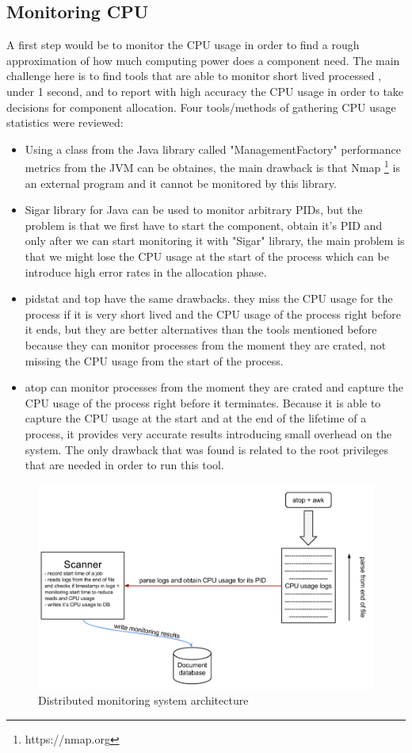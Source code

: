 \subsection{Monitoring CPU}
A first step would be to monitor the CPU usage in order to find a rough approximation of how much computing power does a component need. The main challenge here is to find tools that are able to monitor short lived processed , under 1 second, and to report with high accuracy the CPU usage in order to take decisions for component allocation. Four tools/methods of gathering CPU usage statistics were reviewed:  
\begin{itemize}
	\item Using a class from the Java library called "ManagementFactory" performance metrics from the JVM can be obtaines, the main drawback is that Nmap \footnote{https://nmap.org} is an external program and it cannot be monitored by this library.
	\item Sigar library for Java can be used to monitor arbitrary PIDs, but the problem is that we first have to start the component, obtain it's PID and only after we can start monitoring it with "Sigar" library, the main problem is that we might lose the CPU usage at the start of the process which can be introduce high error rates in the allocation phase.
	\item pidstat and top have the same drawbacks. they miss the CPU usage for the process if it is very short lived and the CPU usage of the process right before it ends, but they are better alternatives than the tools mentioned before because they can monitor processes from the moment they are crated, not missing the CPU usage from the start of the process.
	\item atop can monitor processes from the moment they are crated and capture the CPU usage of the process right before it terminates. Because it is able to capture the CPU usage at the start and at the end of the lifetime of a process, it provides very accurate results introducing small overhead on the system. The only drawback that was found is related to the root privileges that are needed in order to run this tool.
\end{itemize}
 
\begin{figure}[t]
\centering
\includegraphics[width=\linewidth]{./img/MonitoringCPUMechanism.png}
\caption{Distributed monitoring system architecture}
\label{fig:monitoringArchitecture}
\end{figure} 
 
